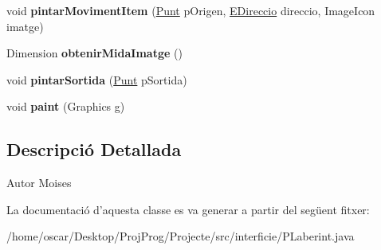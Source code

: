 \begin{DoxyCompactItemize}
\item 
\hypertarget{classinterficie_1_1_p_laberint_a3011192dc187518b6053a6216fce2b12}{void {\bfseries pintar\+Moviment\+Item} (\hyperlink{classlogica_1_1_punt}{Punt} p\+Origen, \hyperlink{enumlogica_1_1enumeracions_1_1_e_direccio}{E\+Direccio} direccio, Image\+Icon imatge)}\label{classinterficie_1_1_p_laberint_a3011192dc187518b6053a6216fce2b12}

\item 
\hypertarget{classinterficie_1_1_p_laberint_a75f1299521583b891d6af4e0fa0df179}{Dimension {\bfseries obtenir\+Mida\+Imatge} ()}\label{classinterficie_1_1_p_laberint_a75f1299521583b891d6af4e0fa0df179}

\item 
\hypertarget{classinterficie_1_1_p_laberint_adc6caa1f1d91892ea56077d2facac8ec}{void {\bfseries pintar\+Sortida} (\hyperlink{classlogica_1_1_punt}{Punt} p\+Sortida)}\label{classinterficie_1_1_p_laberint_adc6caa1f1d91892ea56077d2facac8ec}

\item 
\hypertarget{classinterficie_1_1_p_laberint_af8eb42e37de9874c0810fae1d6595ba4}{void {\bfseries paint} (Graphics g)}\label{classinterficie_1_1_p_laberint_af8eb42e37de9874c0810fae1d6595ba4}

\end{DoxyCompactItemize}


\subsection{Descripció Detallada}
\begin{DoxyAuthor}{Autor}
Moises 
\end{DoxyAuthor}


La documentació d'aquesta classe es va generar a partir del següent fitxer\+:\begin{DoxyCompactItemize}
\item 
/home/oscar/\+Desktop/\+Proj\+Prog/\+Projecte/src/interficie/P\+Laberint.\+java\end{DoxyCompactItemize}
